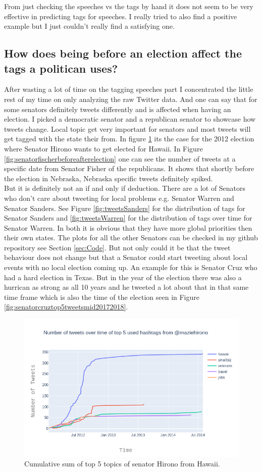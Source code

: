 \documentclass[10pt,conference,compsocconf]{IEEEtran}
\begin{document}
From just checking the speeches vs the tags by hand it does not seem to be very effective in predicting tags for speeches. 
I really tried to also find a positive example but I just couldn't really find a satisfying one.

 
\subsection{How does being before an election affect the tags a politican uses? }
After wasting a lot of time on the tagging speeches part I concentrated the little rest of my time on only analyzing the raw Twitter data. And one can say that for some senators definitely tweets differently and is affected when having an election. I picked a democratic senator and a republican senator to showcase how tweets change. Local topic get very important for senators and most tweets will get tagged with the state their from. In figure \ref{fig:hironobeforeafterelection} its the case for the 2012 election where Senator Hirono wants to get elected for Hawaii. In Figure \ref{fig:senatorfischerbeforeafterelection} one can see the number of tweets at a specific date from Senator Fisher of the republicans. It shows that shortly before the election in Nebraska, Nebraska specific tweets definitely spiked.\\
But it is definitely not an if and only if deduction. There are a lot of Senators who don't care about tweeting for local problems e.g. Senator Warren and Senator Sanders. See Figure \ref{fig:tweetsSanders} for the distribution of tags for Senator Sanders and \ref{fig:tweetsWarren} for the distribution of tags over time for Senator Warren. In both it is obvious that they have more global priorities then their own states. The plots for all the other Senators can be checked in my github repository see Section \ref{sec:Code}. But not only could it be that the tweet behaviour does not change but that a Senator could start tweeting about local events with no local election coming up. An example for this is Senator Cruz who had a hard election in Texas. But in the year of the election there was also a hurrican as strong as all 10 years and he tweeted a lot about that in that same time frame which is also the time of the election seen in Figure \ref{fig:senatorcruztop5tweetsmid20172018}.
 
\begin{figure}
	\centering
	\includegraphics[width=0.7\linewidth]{images/hirono_before_after_election}
	\caption{Cumulative sum of top 5 topics of senator Hirono from Hawaii. }
	\label{fig:hironobeforeafterelection}
\end{figure}
\end{document}

